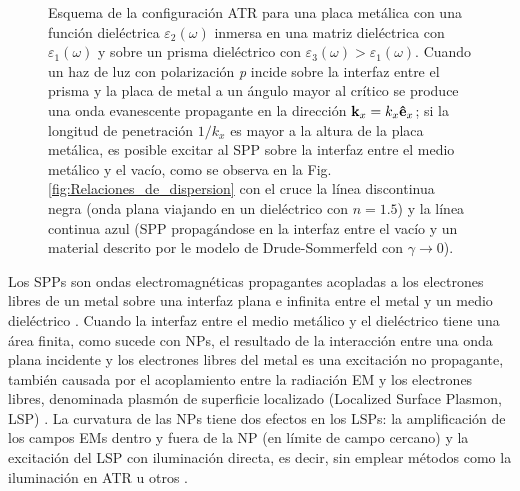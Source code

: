 \begin{figure}[h!]
\begin{tikzpicture}
\end{tikzpicture}	
	\caption{ Esquema de la configuración ATR para una placa metálica con una función dieléctrica $\varepsilon_2(\omega)$ inmersa en una matriz dieléctrica con $\varepsilon_1(\omega)$ y sobre un prisma dieléctrico con $\varepsilon_3(\omega)>\varepsilon_1(\omega)$. Cuando un haz de luz con polarización \emph{p} incide sobre la interfaz entre el prisma y la placa de metal a un ángulo mayor al crítico se produce una onda evanescente propagante en la dirección $\vb{k}_x=k_x\vu{e}_x$; si la longitud de penetración $1/k_x$ es mayor a la altura de la placa metálica, es posible excitar al SPP sobre la interfaz entre el medio metálico y el vacío, como se observa en la Fig. \ref{fig:Relaciones_de_dispersion} con el cruce la línea discontinua negra (onda plana viajando en un dieléctrico con $n=1.5$) y la línea continua azul (SPP propagándose en la interfaz entre el vacío y un material descrito por le modelo de Drude-Sommerfeld con $\gamma\to 0$).}
	\label{fig:ATR}
	\end{figure}
		
Los SPPs son ondas electromagnéticas propagantes acopladas a los electrones libres de un metal sobre una interfaz plana e infinita entre el metal y un medio dieléctrico \cite{maier2007plasmonics}. Cuando la interfaz  entre el medio metálico y el dieléctrico tiene una área finita, como sucede con NPs, el resultado de la interacción entre una onda plana incidente y los electrones libres del metal es una excitación no propagante, también causada por el acoplamiento entre la radiación EM y los electrones libres, denominada plasmón de superficie localizado (Localized Surface Plasmon, LSP) \cite{maier2007plasmonics}. La curvatura de las NPs tiene dos efectos en los LSPs: la amplificación de los campos EMs dentro y fuera de la NP (en límite de campo cercano) y la excitación del LSP con iluminación directa, es decir, 
sin emplear métodos como la iluminación en ATR u otros \cite{maier2007plasmonics}.

